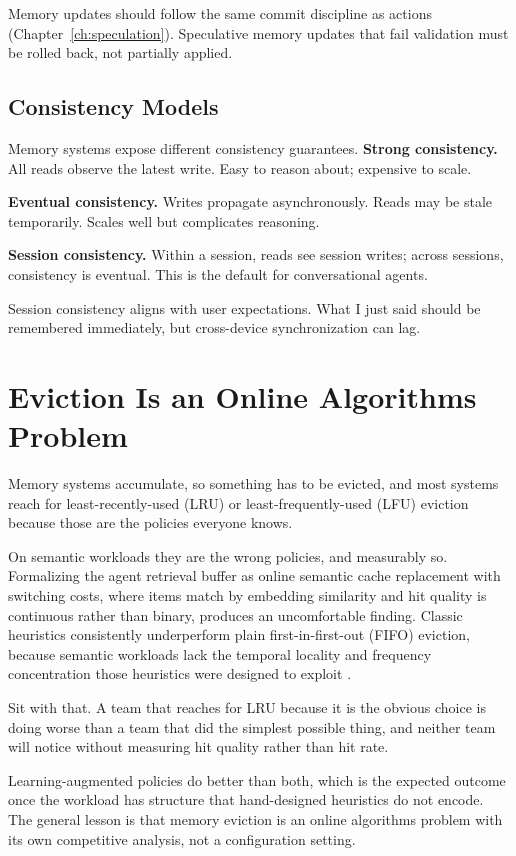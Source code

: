 Memory updates should follow the same commit discipline as actions (Chapter~\ref{ch:speculation}). Speculative memory updates that fail validation must be rolled back, not partially applied.

\subsection{Consistency Models}

Memory systems expose different consistency guarantees. \textbf{Strong consistency.}
All reads observe the latest write. Easy to reason about; expensive to scale.

\textbf{Eventual consistency.}
Writes propagate asynchronously. Reads may be stale temporarily. Scales well but complicates reasoning.

\textbf{Session consistency.}
Within a session, reads see session writes; across sessions, consistency is eventual. This is the default for conversational agents.

Session consistency aligns with user expectations. What I just said should be remembered immediately, but cross-device synchronization can lag.

\section{Eviction Is an Online Algorithms Problem}

Memory systems accumulate, so something has to be evicted, and most systems reach for least-recently-used (LRU) or least-frequently-used (LFU) eviction because those are the policies everyone knows.

On semantic workloads they are the wrong policies, and measurably so. Formalizing
the agent retrieval buffer as online semantic cache replacement with switching
costs, where items match by embedding similarity and hit quality is continuous
rather than binary, produces an uncomfortable finding. Classic heuristics consistently underperform plain first-in-first-out (FIFO) eviction, because semantic workloads lack the temporal locality and frequency concentration those heuristics were designed to exploit \cite{cachepolicy2026}.

Sit with that. A team that reaches for LRU because it is the obvious choice is
doing worse than a team that did the simplest possible thing, and neither team
will notice without measuring hit quality rather than hit rate.

Learning-augmented policies do better than both, which is the expected outcome
once the workload has structure that hand-designed heuristics do not encode.
The general lesson is that memory eviction is an online algorithms problem with
its own competitive analysis, not a configuration setting.

